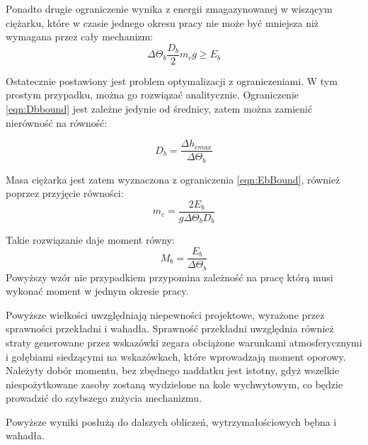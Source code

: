 Ponadto drugie ograniczenie wynika z energii zmagazynowanej w wiszącym ciężarku, które w czasie jednego okresu pracy nie może być mniejsza niż wymagana przez cały mechanizm:
\begin{equation}
\label{eqn:EbBound}
\Delta \Theta_b \frac{D_b}{2} m_c g \geq E_b
\end{equation}

Ostatecznie postawiony jest problem optymalizacji z ograniczeniami. W tym prostym przypadku, można go rozwiązać analitycznie. Ograniczenie \ref{eqn:Dbbound} jest zależne jedynie od średnicy, zatem można zamienić nierówność na równość:

\begin{equation}
D_b = \frac{\Delta h_{cmax}}{\Delta \Theta_b}
\end{equation}

Masa ciężarka jest zatem wyznaczona z ograniczenia \ref{eqn:EbBound}, również poprzez przyjęcie równości:
\begin{equation}
m_c = \frac{2E_b}{g\Delta \Theta_b D_b}
\end{equation}

Takie rozwiązanie daje moment równy:
\begin{equation}
M_b = \frac{E_b}{\Delta \Theta_b}
\end{equation}
Powyższy wzór nie przypadkiem przypomina zależność na pracę którą musi wykonać moment w jednym okresie pracy.

Powyższe wielkości uwzględniają niepewności projektowe, wyrażone przez sprawności przekładni i wahadła. Sprawność przekładni uwzględnia również straty generowane przez wskazówki zegara obciążone warunkami atmosferycznymi i gołębiami siedzącymi na wskazówkach, które wprowadzają moment oporowy. Należyty dobór momentu, bez zbędnego naddatku jest istotny, gdyż wszelkie niespożytkowane zasoby zostaną wydzielone na kole wychwytowym, co będzie prowadzić do szybszego zużycia mechanizmu.

Powyższe wyniki posłużą do dalszych obliczeń, wytrzymałościowych bębna i wahadła.